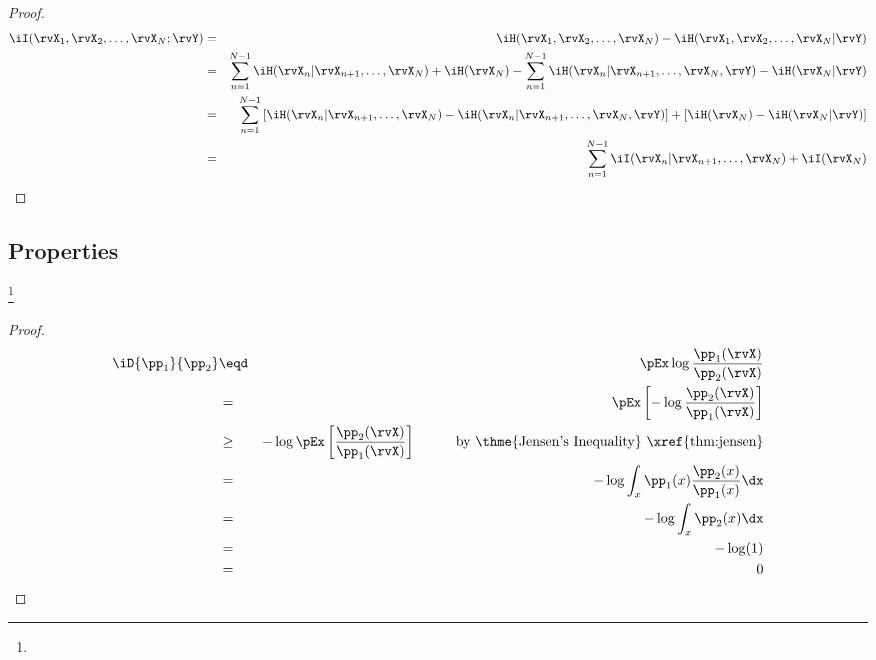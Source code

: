 \begin{theorem}
\end{theorem}
\begin{proof}
\begin{eqnarray*}
  \iI(\rvX_1,\rvX_2,\ldots,\rvX_N;\rvY)
    &=& \iH(\rvX_1,\rvX_2,\ldots,\rvX_N) - \iH(\rvX_1,\rvX_2,\ldots,\rvX_N|\rvY)
  \\&=& \sum_{n=1}^{N-1}\iH(\rvX_n|\rvX_{n+1},\ldots,\rvX_N) + \iH(\rvX_N) 
        - \sum_{n=1}^{N-1}\iH(\rvX_n|\rvX_{n+1},\ldots,\rvX_N,\rvY) - \iH(\rvX_N|\rvY) 
  \\&=& \sum_{n=1}^{N-1}\left[ 
        \iH(\rvX_n|\rvX_{n+1},\ldots,\rvX_N) - \iH(\rvX_n|\rvX_{n+1},\ldots,\rvX_N,\rvY) 
        \right]
        + \left[ \iH(\rvX_N) - \iH(\rvX_N|\rvY) \right]
  \\&=& \sum_{n=1}^{N-1}\iI(\rvX_n|\rvX_{n+1},\ldots,\rvX_N) 
        + \iI(\rvX_N) 
\end{eqnarray*}
\end{proof}

\subsection{Properties}
\begin{theorem}
\footnote{
  }
\end{theorem}
\begin{proof}
\begin{eqnarray*}
  \iD{\pp_1}{\pp_2}
    &\eqd& \pEx\log\frac{\pp_1(\rvX)}{\pp_2(\rvX)}
  \\&=&    \pEx\left[-\log\frac{\pp_2(\rvX)}{\pp_1(\rvX)} \right]
  \\&\ge&  -\log\pEx\left[\frac{\pp_2(\rvX)}{\pp_1(\rvX)} \right]
    \hspace{1cm}\mbox{by \thme{Jensen's Inequality} \xref{thm:jensen}}
  \\&=&    -\log\int_x \pp_1(x)\frac{\pp_2(x)}{\pp_1(x)} \dx
  \\&=&    -\log\int_x \pp_2(x) \dx
  \\&=&    -\log(1)
  \\&=&    0
\end{eqnarray*}
\end{proof}
